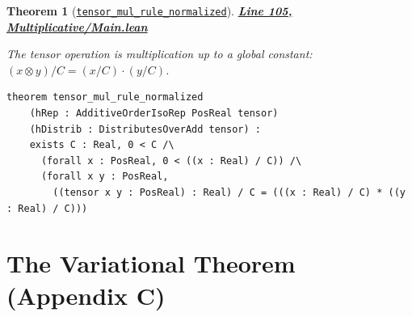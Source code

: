 \documentclass[11pt]{article}
\newtheorem{theorem}{Theorem}[section]
\theoremstyle{definition}
\theoremstyle{remark}
\begin{document}
\begin{center}
\end{center}

\begin{theorem}[\href{https://github.com/zariuq/ks-foundations-of-inference/blob/main/KnuthSkilling/Multiplicative/Main.lean}{\texttt{tensor\_mul\_rule\_normalized}}]
\textbf{\href{https://github.com/zariuq/ks-foundations-of-inference/blob/main/KnuthSkilling/Multiplicative/Main.lean}{Line 105, Multiplicative/Main.lean}}

The tensor operation is multiplication up to a global constant:
$(x \otimes y) / C = (x/C) \cdot (y/C)$.
\end{theorem}

\begin{lstlisting}[caption={Product rule (normalized)}]
theorem tensor_mul_rule_normalized
    (hRep : AdditiveOrderIsoRep PosReal tensor)
    (hDistrib : DistributesOverAdd tensor) :
    exists C : Real, 0 < C /\
      (forall x : PosReal, 0 < ((x : Real) / C)) /\
      (forall x y : PosReal,
        ((tensor x y : PosReal) : Real) / C = (((x : Real) / C) * ((y : Real) / C)))
\end{lstlisting}

\section{The Variational Theorem (Appendix C)}
\end{document}
